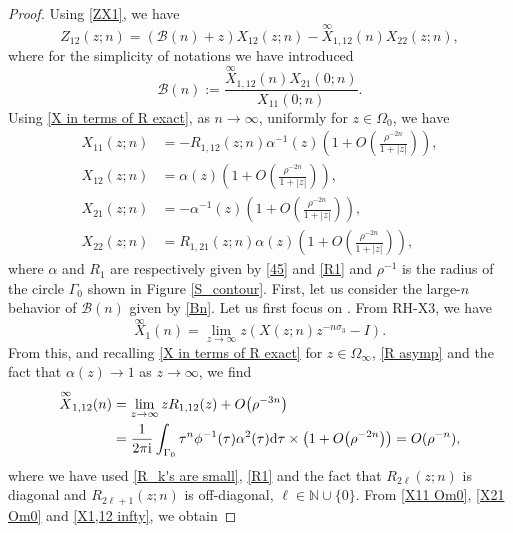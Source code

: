 \documentclass[pdftex]{sigma}
\numberwithin{equation}{section}
\newcommand{\N}{{\mathbb N}}
\newcommand{\al}{\alpha}
\newcommand{\Ga}{\Gamma}
\newcommand{\Om}{\Omega}
\newcommand{\ii}{{\rm i}}
\newcommand{\dd}{{\rm d}}
\begin{document}
		\begin{proof}
			Using \eqref{ZX1}, we have
			\begin{equation}\label{Z12}
				Z_{12}(z;n) = (\mathscr{B}(n)+z) X_{12}(z;n) -\overset{\infty}{X}_{1,12}(n) X_{22}(z;n),
			\end{equation}
			where for the simplicity of notations we have introduced
			\begin{equation}\label{Bn}
				\mathscr{B}(n) := \frac{\overset{\infty}{X}_{1,12}(n)X_{21}(0;n)}{X_{11}(0;n)}.
			\end{equation}
			Using \eqref{X in terms of R exact}, as $n \to \infty$, uniformly for $z\in \Om_0$, we have
			\begin{align}
				X_{11}(z;n) & = - R_{1,12}(z;n) \al^{-1}(z) \left( 1 + O \left( \frac{\rho^{-2n}}{1+|z|} \right) \right), \label{X11 Om0} \\
				X_{12}(z;n) & = \al(z) \left( 1 + O \left( \frac{\rho^{-2n}}{1+|z|} \right) \right), \nonumber \\
				X_{21}(z;n) & = - \al^{-1}(z) \left( 1 + O \left( \frac{\rho^{-2n}}{1+|z|} \right) \right), \label{X21 Om0}\\
				X_{22}(z;n) & = R_{1,21}(z;n) \al(z) \left( 1 + O \left( \frac{\rho^{-2n}}{1+|z|} \right) \right), \label{X22 Om0}
			\end{align}
			where $\al$ and $R_1$ are respectively given by \eqref{45} and \eqref{R1} and $\rho^{-1}$ is the radius of the circle $\Ga_0$ shown in Figure \ref{S_contour}. First, let us consider the large-$n$ behavior of $\mathscr{B}(n)$ given by \eqref{Bn}. Let us first focus on . From {\rm RH-X3}, we have
			\begin{equation*}
				\overset{\infty}{X}_{1}(n) = \lim_{z \to \infty} z( X(z;n)z^{-n\sigma_3} - I ).
			\end{equation*}
			From this, and recalling \eqref{X in terms of R exact} for $z \in \Om_{\infty}$, \eqref{R asymp} and the fact that $\al(z) \to 1$ as $z \to \infty$, we find
			\begin{align}
				\overset{\infty}{X}_{1,12}(n) &= \lim_{z \to \infty} z R_{1,12}(z) + O\big(\rho^{-3n}\big) \nonumber\\
&= \frac{1}{2 \pi \ii} \int_{\Ga_0} \tau^n \phi^{-1}(\tau) \al^2(\tau) \dd \tau \times \big(1 + O\big(\rho^{-2n}\big)\big) = O(\rho^{-n}),\label{X1,12 infty}
			\end{align}
			where we have used \eqref{R_k's are small}, \eqref{R1} and the fact that $R_{2\ell}(z;n)$ is diagonal and $R_{2\ell+1}(z;n)$ is off-diagonal, $\ell \in \N \cup \{0\}$. From \eqref{X11 Om0}, \eqref{X21 Om0} and \eqref{X1,12 infty}, we obtain

\end{proof}
\end{document}

